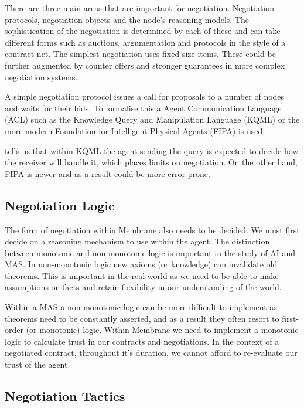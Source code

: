 \documentclass[11pt, a4paper, twocolumn, twoside]{report}
\begin{document}
There are three main areas that are important for negotiation. Negotiation protocols, negotiation objects and the node's reasoning models. \citep{beer1999negotiation} The sophistication of the negotiation is determined by each of these and can take different forms such as auctions, argumentation and protocols in the style of a contract net. The simplest negotiation uses fixed size items. These could be further augmented by counter offers and stronger guarantees in more complex negotiation systems.

A simple negotiation protocol issues a call for proposals to a number of nodes and waits for their bids. To formalise this a Agent Communication Language (ACL) such as the Knowledge Query and Manipulation Language (KQML) \citep{finin1992specification} or the more modern Foundation for Intelligent Physical Agents (FIPA) \citep{fipa2002fipa} is used.

\citep{rahwan2005interest} \cite{beer1999negotiation} tells us that within KQML the agent sending the query is expected to decide how the receiver will handle it, which places limits on negotiation. On the other hand, FIPA is newer and as a result could be more error prone.

\subsection{Negotiation Logic}

The form of negotiation within Membrane also needs to be decided. We must first decide on a reasoning mechanism to use within the agent. The distinction between monotonic and non-monotonic logic is important in the study of AI and MAS. In non-monotonic logic new axioms (or knowledge) can invalidate old theorems. \citep*{mcdermott1980non, antonelli2008non} This is important in the real world as we need to be able to make assumptions on facts and retain flexibility in our understanding of the world.

Within a MAS a non-monotonic logic can be more difficult to implement as theorems need to be constantly asserted, and as a result they often resort to first-order (or monotonic) logic. Within Membrane we need to implement a monotonic logic to calculate trust in our contracts and negotiations. In the context of a negotiated contract, throughout it's duration, we cannot afford to re-evaluate our trust of the agent.

\subsection{Negotiation Tactics}
\end{document}
